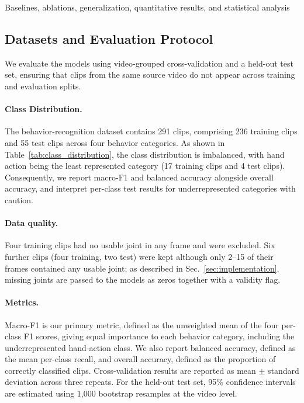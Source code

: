 \documentclass[10pt,twocolumn,letterpaper]{article}
\begin{document}
Baselines, ablations, generalization, quantitative results, and statistical analysis


\subsection{Datasets and Evaluation Protocol}
\label{sec:datasets_protocol}

We evaluate the models using video-grouped cross-validation and a
held-out test set, ensuring that clips from the same source video
do not appear across training and evaluation splits.



\paragraph{Class Distribution.}
The behavior-recognition dataset contains 291 clips, comprising
236 training clips and 55 test clips across four behavior categories.
As shown in Table~\ref{tab:class_distribution}, the class distribution
is imbalanced, with hand action being the least represented category
(17 training clips and 4 test clips). Consequently, we report macro-F1
and balanced accuracy alongside overall accuracy, and interpret
per-class test results for underrepresented categories with caution.

\paragraph{Data quality.}
Four training clips had no usable joint in any frame and were excluded. Six further clips (four training, two test) were kept although only 2--15 of their frames contained any usable joint; as described in Sec.~\ref{sec:implementation}, missing joints are passed to the models as zeros together with a validity flag.


\paragraph{Metrics.}
Macro-F1 is our primary metric, defined as the unweighted mean of the
four per-class F1 scores, giving equal importance to each behavior
category, including the underrepresented hand-action class. We also
report balanced accuracy, defined as the mean per-class recall, and
overall accuracy, defined as the proportion of correctly classified
clips. Cross-validation results are reported as mean $\pm$ standard
deviation across three repeats. For the held-out test set, 95\%
confidence intervals are estimated using 1,000 bootstrap resamples
at the video level.
\end{document}
